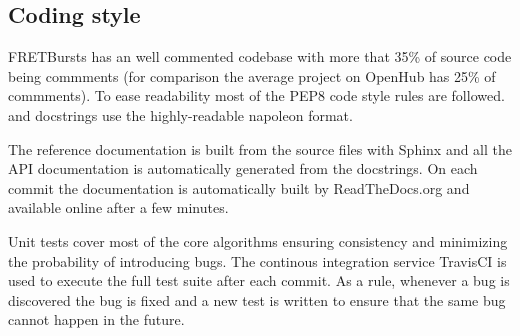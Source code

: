 \subsection{Coding style}

FRETBursts has an well commented codebase with more that 35\% of source code
being commments (for comparison the average project on OpenHub has 25\%
of commments). To ease readability most of the PEP8 code style rules are followed.
and docstrings use the highly-readable napoleon format.

The reference documentation is built from the source files with Sphinx and
all the API documentation is automatically generated from the docstrings.
On each commit the documentation is automatically built by ReadTheDocs.org
and available online after a few minutes.

Unit tests cover most of the core algorithms ensuring consistency and 
minimizing the probability of introducing bugs. The continous integration
service TravisCI is used to execute the full test suite after each commit.
As a rule, whenever a bug is discovered the bug is fixed and a new test is 
written to ensure that the same bug cannot happen in the future.

